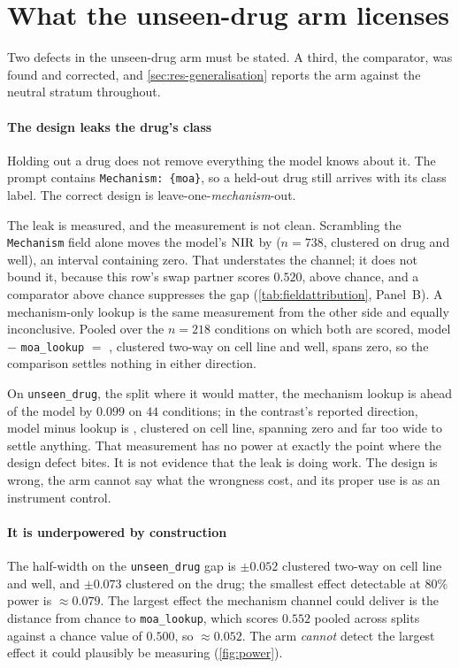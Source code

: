 \section{What the unseen-drug arm licenses}

Two defects in the unseen-drug arm must be stated. A third, the comparator, was
found and corrected, and \cref{sec:res-generalisation} reports the arm against
the neutral stratum throughout.

\paragraph{The design leaks the drug's class} Holding out a drug does not
remove everything the model knows about it. The prompt contains
\texttt{Mechanism: \{moa\}}, so a held-out drug still arrives with its class
label. The correct design is leave-one-\emph{mechanism}-out.

The leak is measured, and the measurement is not clean. Scrambling the
\texttt{Mechanism} field alone moves the model's $\textrm{NIR}$ by
 ($n = \num{738}$, clustered on drug and well), an
interval containing zero. That understates the channel; it does not bound it,
because this row's swap partner scores $0.520$, above chance, and a comparator
above chance suppresses the gap (\cref{tab:fieldattribution}, Panel~B). A
mechanism-only lookup is the same measurement from the other side and equally
inconclusive. Pooled over the $n = \num{218}$ conditions on which both are
scored, model $-$ \texttt{moa\_lookup} $=$ ,
clustered two-way on cell line and well, spans zero, so the comparison settles
nothing in either direction.

On \texttt{unseen\_drug}, the split where it would matter, the mechanism lookup
is ahead of the model by $0.099$ on $44$ conditions; in the contrast's reported
direction, model minus lookup is , clustered on cell
line, spanning zero and far too wide to settle anything. That measurement has no
power at exactly the point where the design defect bites. It is not evidence
that the leak is doing work. The design is wrong, the arm cannot say what the
wrongness cost, and its proper use is as an instrument control.

\paragraph{It is underpowered by construction} The half-width on the
\texttt{unseen\_drug} gap is $\pm 0.052$ clustered two-way on cell line and
well, and $\pm 0.073$ clustered on the drug; the smallest effect detectable at
$80\%$ power is $\approx 0.079$. The largest effect the mechanism channel could
deliver is the distance from chance to \texttt{moa\_lookup}, which scores
$0.552$ pooled across splits against a chance value of $0.500$, so $\approx
0.052$. The arm \emph{cannot} detect the largest effect it could plausibly be
measuring (\cref{fig:power}).

